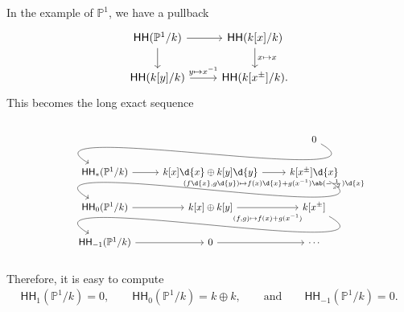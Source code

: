 \documentclass[10pt]{amsart}
\theoremstyle{definition}
\theoremstyle{remark}
\theoremstyle{plain}
\theoremstyle{definition}
\theoremstyle{remark}
\renewcommand{\P}{\mathbb{P}}
\newcommand{\ms}[1]{\mathsf{#1}}
\newcommand{\1}{\mathbf{1}}
\newcommand{\2}{\mathbf{2}}
\newcommand{\3}{\mathbf{3}}
\newcommand{\HH}{\ms{HH}}
\begin{document}
In the example of $\P^1$, we have a pullback
\begin{equation*}
\begin{tikzcd}
    \HH(\P^1/k) \ar{r} \ar{d} & \HH(k[x]/k) \ar{d}{x \mapsto x} \\
    \HH(k[y]/k) \ar{r}{y \mapsto x^{-1}} & \HH(k[x^{\pm}]/k).
\end{tikzcd}
\end{equation*}
This becomes the long exact sequence
\begin{equation*}
    \begin{tikzcd}
        & & 0 \ar[out=-30,in=150]{dll} \\
        \HH_*(\P^1/k) \rar & k[x]\d{x} \oplus k[y] \d{y} \arrow[swap, r, "{(f \d{x}, g \d{y}) \mapsto f(x)\d{x} + g(x^{-1})\ab(-\frac{1}{x^2}) \d{x}}" {yshift=-1ex}] & k[x^{\pm}] \d{x} \ar[out=-30,in=150]{dll} \\
        \HH_{0}(\P^1/k) \ar{r} & k[x] \oplus k[y] \arrow[swap, r, "{(f,g) \mapsto f(x)+g(x^{-1})}" {yshift=-1ex}] & k[x^{\pm}]\arrow[out=-30,in=150]{dll} \\
        \HH_{-1}(\P^1/k) \ar{r} & 0 \ar{r} & \cdots
    \end{tikzcd}
\end{equation*}
Therefore, it is easy to compute
\begin{align*}
    \HH_1(\P^1/k) = 0, \qquad \HH_0(\P^1/k) = k \oplus k, \qquad \text{and} \qquad \HH_{-1}(\P^1/k) = 0.
\end{align*}
\end{document}
